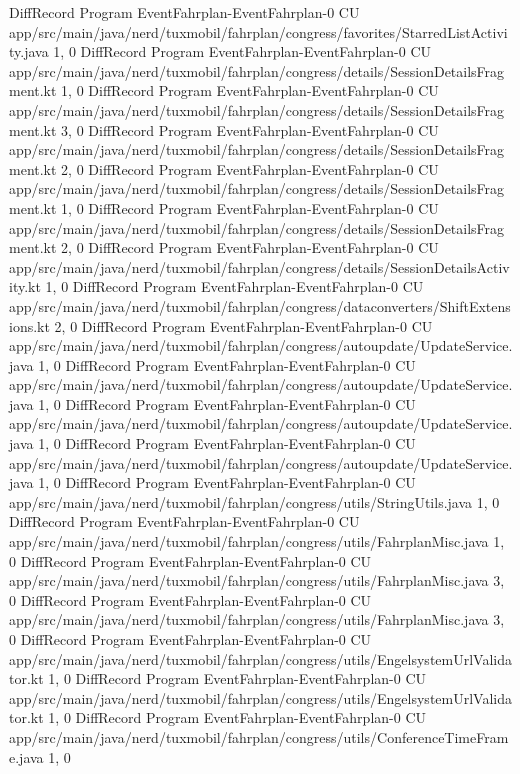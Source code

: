 DiffRecord Program EventFahrplan-EventFahrplan-0 CU app/src/main/java/nerd/tuxmobil/fahrplan/congress/favorites/StarredListActivity.java  {1, 0}
DiffRecord Program EventFahrplan-EventFahrplan-0 CU app/src/main/java/nerd/tuxmobil/fahrplan/congress/details/SessionDetailsFragment.kt  {1, 0}
DiffRecord Program EventFahrplan-EventFahrplan-0 CU app/src/main/java/nerd/tuxmobil/fahrplan/congress/details/SessionDetailsFragment.kt  {3, 0}
DiffRecord Program EventFahrplan-EventFahrplan-0 CU app/src/main/java/nerd/tuxmobil/fahrplan/congress/details/SessionDetailsFragment.kt  {2, 0}
DiffRecord Program EventFahrplan-EventFahrplan-0 CU app/src/main/java/nerd/tuxmobil/fahrplan/congress/details/SessionDetailsFragment.kt  {1, 0}
DiffRecord Program EventFahrplan-EventFahrplan-0 CU app/src/main/java/nerd/tuxmobil/fahrplan/congress/details/SessionDetailsFragment.kt  {2, 0}
DiffRecord Program EventFahrplan-EventFahrplan-0 CU app/src/main/java/nerd/tuxmobil/fahrplan/congress/details/SessionDetailsActivity.kt  {1, 0}
DiffRecord Program EventFahrplan-EventFahrplan-0 CU app/src/main/java/nerd/tuxmobil/fahrplan/congress/dataconverters/ShiftExtensions.kt  {2, 0}
DiffRecord Program EventFahrplan-EventFahrplan-0 CU app/src/main/java/nerd/tuxmobil/fahrplan/congress/autoupdate/UpdateService.java  {1, 0}
DiffRecord Program EventFahrplan-EventFahrplan-0 CU app/src/main/java/nerd/tuxmobil/fahrplan/congress/autoupdate/UpdateService.java  {1, 0}
DiffRecord Program EventFahrplan-EventFahrplan-0 CU app/src/main/java/nerd/tuxmobil/fahrplan/congress/autoupdate/UpdateService.java  {1, 0}
DiffRecord Program EventFahrplan-EventFahrplan-0 CU app/src/main/java/nerd/tuxmobil/fahrplan/congress/autoupdate/UpdateService.java  {1, 0}
DiffRecord Program EventFahrplan-EventFahrplan-0 CU app/src/main/java/nerd/tuxmobil/fahrplan/congress/utils/StringUtils.java  {1, 0}
DiffRecord Program EventFahrplan-EventFahrplan-0 CU app/src/main/java/nerd/tuxmobil/fahrplan/congress/utils/FahrplanMisc.java  {1, 0}
DiffRecord Program EventFahrplan-EventFahrplan-0 CU app/src/main/java/nerd/tuxmobil/fahrplan/congress/utils/FahrplanMisc.java  {3, 0}
DiffRecord Program EventFahrplan-EventFahrplan-0 CU app/src/main/java/nerd/tuxmobil/fahrplan/congress/utils/FahrplanMisc.java  {3, 0}
DiffRecord Program EventFahrplan-EventFahrplan-0 CU app/src/main/java/nerd/tuxmobil/fahrplan/congress/utils/EngelsystemUrlValidator.kt  {1, 0}
DiffRecord Program EventFahrplan-EventFahrplan-0 CU app/src/main/java/nerd/tuxmobil/fahrplan/congress/utils/EngelsystemUrlValidator.kt  {1, 0}
DiffRecord Program EventFahrplan-EventFahrplan-0 CU app/src/main/java/nerd/tuxmobil/fahrplan/congress/utils/ConferenceTimeFrame.java  {1, 0}
